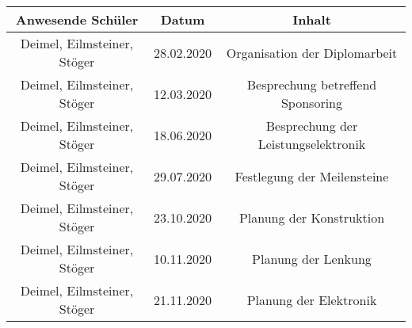 \begin{tabular}[h]{|c|c|c|}
    \hline
    \textbf{Anwesende Schüler} & \textbf{Datum}  & \textbf{Inhalt} \\
    \hline
    Deimel, Eilmsteiner, Stöger & 28.02.2020 & Organisation der Diplomarbeit \\
    \hline
    Deimel, Eilmsteiner, Stöger & 12.03.2020 & Besprechung betreffend Sponsoring \\
    \hline
    Deimel, Eilmsteiner, Stöger & 18.06.2020 & Besprechung der Leistungselektronik \\
    \hline
    Deimel, Eilmsteiner, Stöger & 29.07.2020 & Festlegung der Meilensteine \\
    \hline
    Deimel, Eilmsteiner, Stöger & 23.10.2020 & Planung der Konstruktion \\
    \hline
    Deimel, Eilmsteiner, Stöger & 10.11.2020 & Planung der Lenkung \\
    \hline 
    Deimel, Eilmsteiner, Stöger & 21.11.2020 & Planung der Elektronik \\
    \hline
\end{tabular}